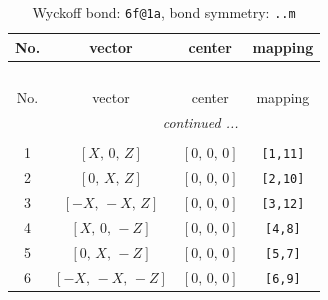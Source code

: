 \documentclass[fleqn,8pt]{jsarticle}
\begin{document}
\begin{longtable}{cccc}
\caption{Wyckoff bond: {\tt 6f@1a}, bond symmetry: {\tt ..m}}
 \\
 \hline \hline
No. & vector & center & mapping \\ \hline \endfirsthead

\multicolumn{3}{l}{\tablename\ \thetable{}} \\
 \hline \hline
No. & vector & center & mapping \\ \hline \endhead

 \hline \hline
\multicolumn{3}{r}{\footnotesize\it continued ...} \\ \endfoot

 \hline \hline
\multicolumn{3}{r}{} \\ \endlastfoot

1 & $\left[ X,\, 0,\, Z \right]$ & $\left[ 0,\, 0,\, 0 \right]$ & {\tt [1,11]} \\ \hline
2 & $\left[ 0,\, X,\, Z \right]$ & $\left[ 0,\, 0,\, 0 \right]$ & {\tt [2,10]} \\ \hline
3 & $\left[ - X,\, - X,\, Z \right]$ & $\left[ 0,\, 0,\, 0 \right]$ & {\tt [3,12]} \\ \hline
4 & $\left[ X,\, 0,\, - Z \right]$ & $\left[ 0,\, 0,\, 0 \right]$ & {\tt [4,8]} \\ \hline
5 & $\left[ 0,\, X,\, - Z \right]$ & $\left[ 0,\, 0,\, 0 \right]$ & {\tt [5,7]} \\ \hline
6 & $\left[ - X,\, - X,\, - Z \right]$ & $\left[ 0,\, 0,\, 0 \right]$ & {\tt [6,9]} \\
\end{longtable}
\renewcommand{\arraystretch}{1.2}
\end{document}
